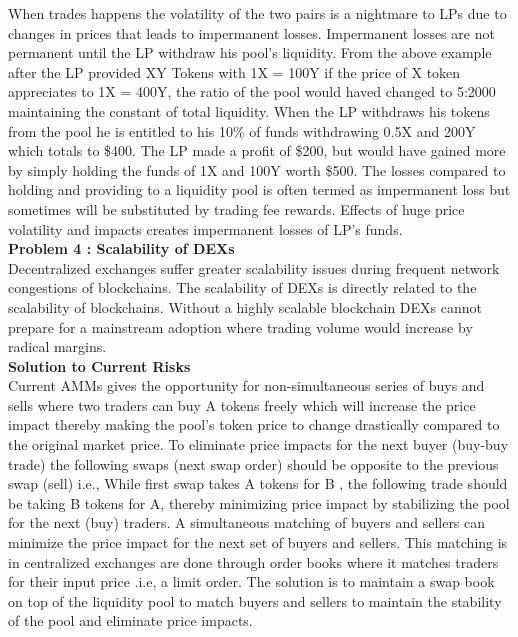 \documentclass[10pt]{article}
\begin{document}
When trades happens the volatility of the two pairs is a nightmare to LPs due to changes in prices that leads to impermanent losses. Impermanent losses are not permanent until the LP withdraw his pool's liquidity. From the above example after the LP provided XY Tokens with 1X = 100Y if the price of X token appreciates to 1X = 400Y, the ratio of the pool would haved changed to 5:2000 maintaining the constant of total liquidity. When the LP withdraws his tokens from the pool he is entitled to his 10\% of funds withdrawing 0.5X and 200Y which totals to \$400. The LP made a profit of \$200, but would have gained more by simply holding the funds of 1X and 100Y worth \$500. The losses compared to holding and providing to a liquidity pool is often termed as impermanent loss but sometimes will be substituted by trading fee rewards. Effects of huge price volatility and impacts creates impermanent losses of LP's funds.\\

\textbf{Problem 4 : Scalability of DEXs}\\

Decentralized exchanges suffer greater scalability issues during frequent network congestions of blockchains. The scalability of DEXs is directly related to the scalability of blockchains. Without a highly scalable blockchain DEXs cannot prepare for a mainstream adoption where trading volume would increase by radical margins.\\

\textbf{Solution to Current Risks}\\

Current AMMs gives the opportunity for non-simultaneous series of buys and sells where two traders can buy A tokens freely which will increase the price impact thereby making the pool's token price to change drastically compared to the original market price. To eliminate price impacts for the next buyer (buy-buy trade) the following swaps (next swap order) should be opposite to the previous swap (sell) i.e., While first swap takes A tokens for B , the following trade should be taking B tokens for A, thereby minimizing price impact by stabilizing the pool for the next (buy) traders. A simultaneous matching of buyers and sellers can minimize the price impact for the next set of buyers and sellers. This matching is in centralized exchanges are done through order books where it matches traders for their input price .i.e, a limit order. The solution is to maintain a swap book on top of the liquidity pool to match buyers and sellers to maintain the stability of the pool and eliminate price impacts.\\
\end{document}
